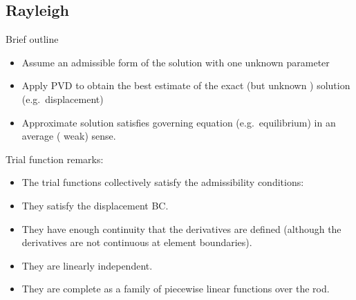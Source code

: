 \hypertarget{rayleigh}{%
\subsection{Rayleigh}\label{rayleigh}}

Brief outline

\begin{itemize}
\tightlist
\item
  Assume an admissible form of the solution with one unknown parameter
\item
  Apply PVD to obtain the best estimate of the exact (but unknown )
  solution (e.g.~displacement)
\item
  Approximate solution satisfies governing equation (e.g.~equilibrium)
  in an average ( weak) sense.
\end{itemize}

Trial function remarks:

\begin{itemize}
\tightlist
\item
  The trial functions collectively satisfy the admissibility conditions:
\item
  They satisfy the displacement BC.
\item
  They have enough continuity that the derivatives are defined (although
  the derivatives are not continuous at element boundaries).
\item
  They are linearly independent.
\item
  They are complete as a family of piecewise linear functions over the
  rod.
\end{itemize}
